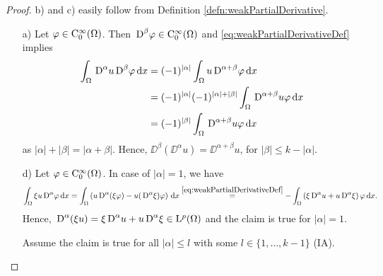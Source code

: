 \begin{proof}
  b) and c) easily follow from Definition \ref{defn:weakPartialDerivative}.

  \begin{enumerate}
  \item[a)] Let $\varphi \in \mathrm{C}_0^\infty(\Omega)$. 
    Then $\,{\operatorname{D}}^\beta \varphi \in \mathrm{C}_0^\infty(\Omega)$ and \eqref{eq:weakPartialDerivativeDef} implies
  \begin{align*}
    \int_\Omega \,{\operatorname{D}}^\alpha u \,{\operatorname{D}}^\beta \varphi \, {\operatorname{d}\!{x}}
    &= (-1)^{|\alpha|} \int_\Omega u \,{\operatorname{D}}^{\alpha + \beta} \varphi \, {\operatorname{d}\!{x}} \\
    &= (-1)^{|\alpha|} (-1)^{|\alpha| + |\beta|} \int_\Omega \,{\operatorname{D}}^{\alpha + \beta} u \varphi \, {\operatorname{d}\!{x}} \\
    &= (-1)^{|\beta|} \int_\Omega \,{\operatorname{D}}^{\alpha + \beta} u \varphi \, {\operatorname{d}\!{x}}
  \end{align*}
  as $|\alpha| + |\beta| = |\alpha + \beta|$.
      Hence, $\DD^\beta(\DD^\alpha u) = \DD^{\alpha + \beta} u$, for $|\beta| \leq k - |\alpha|$.

    \item[d)] Let $\varphi \in \mathrm{C}_0^\infty(\Omega)$. 
      In case of $|\alpha| = 1$, we have
      $$
      \int_\Omega \xi u \,{\operatorname{D}}^\alpha \varphi \, {\operatorname{d}\!{x}} = \int_\Omega \left( u \,{\operatorname{D}}^\alpha(\xi \varphi) - u(\,{\operatorname{D}}^\alpha \xi) \varphi \right) \, {\operatorname{d}\!{x}} \overset{\eqref{eq:weakPartialDerivativeDef}}{=} -\int_\Omega \left( \xi \,{\operatorname{D}}^\alpha u + u \,{\operatorname{D}}^\alpha \xi \right) \varphi \, {\operatorname{d}\!{x}}.
      $$
      Hence, $\,{\operatorname{D}}^\alpha(\xi u) = \xi \,{\operatorname{D}}^\alpha u + u \,{\operatorname{D}}^\alpha \xi \in \mathrm{L}^p(\Omega)$ and the claim is true for $|\alpha| = 1$.

      Assume the claim is true for all $|\alpha| \leq l$ with some $l \in \{1,\dots,k-1\}$ (IA).


\end{enumerate}
\end{proof}
